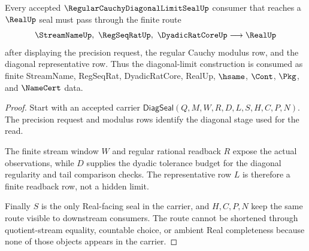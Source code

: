 \begin{theorem}
\label{thm:regular-cauchy-diagonal-limit-seal-route}
Every accepted $\RegularCauchyDiagonalLimitSealUp$ consumer that reaches a $\RealUp$ seal must pass through the finite route
$$
\StreamNameUp,\ \RegSeqRatUp,\ \DyadicRatCoreUp
\longrightarrow
\RealUp
$$
after displaying the precision request, the regular Cauchy modulus row, and the diagonal representative row. Thus the diagonal-limit construction is consumed as finite StreamName, RegSeqRat, DyadicRatCore, RealUp, $\hsame$, $\Cont$, $\Pkg$, and $\NameCert$ data.
\end{theorem}
\begin{proof}
Start with an accepted carrier $\mathsf{DiagSeal}(Q,M,W,R,D,L,S,H,C,P,N)$. The precision request and modulus rows identify the diagonal stage used for the read.

The finite stream window $W$ and regular rational readback $R$ expose the actual observations, while $D$ supplies the dyadic tolerance budget for the diagonal regularity and tail comparison checks. The representative row $L$ is therefore a finite readback row, not a hidden limit.

Finally $S$ is the only Real-facing seal in the carrier, and $H,C,P,N$ keep the same route visible to downstream consumers. The route cannot be shortened through quotient-stream equality, countable choice, or ambient Real completeness because none of those objects appears in the carrier.
\end{proof}





